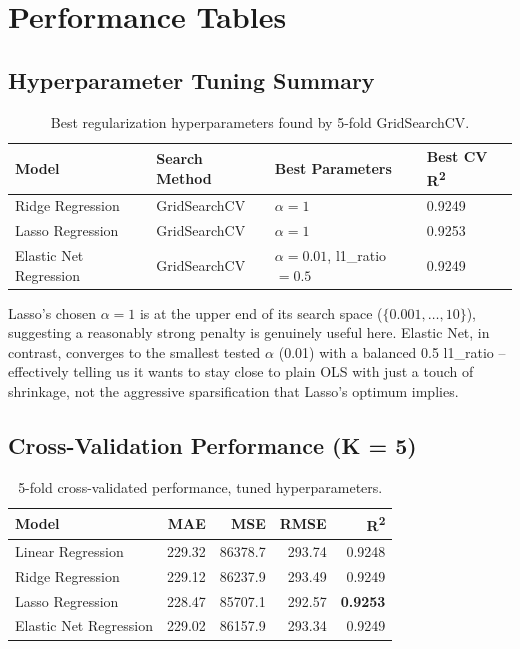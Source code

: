 \documentclass[11pt,a4paper]{article}
\begin{document}
\section{Performance Tables}

\subsection{Hyperparameter Tuning Summary}
\begin{table}[h]
\centering
\begin{tabular}{@{}llll@{}}
\toprule
Model & Search Method & Best Parameters & Best CV R\textsuperscript{2} \\
\midrule
Ridge Regression & GridSearchCV & $\alpha=1$ & 0.9249 \\
Lasso Regression & GridSearchCV & $\alpha=1$ & 0.9253 \\
Elastic Net Regression & GridSearchCV & $\alpha=0.01$, l1\_ratio$=0.5$ & 0.9249 \\
\bottomrule
\end{tabular}
\caption{Best regularization hyperparameters found by 5-fold GridSearchCV.}
\end{table}
Lasso's chosen $\alpha=1$ is at the upper end of its search space ($\{0.001, \ldots, 10\}$), suggesting a reasonably strong penalty is genuinely useful here. Elastic Net, in contrast, converges to the smallest tested $\alpha$ (0.01) with a balanced 0.5 l1\_ratio -- effectively telling us it wants to stay close to plain OLS with just a touch of shrinkage, not the aggressive sparsification that Lasso's optimum implies.

\subsection{Cross-Validation Performance (K = 5)}
\begin{table}[h]
\centering
\begin{tabular}{@{}lrrrr@{}}
\toprule
Model & MAE & MSE & RMSE & R\textsuperscript{2} \\
\midrule
Linear Regression & 229.32 & 86378.7 & 293.74 & 0.9248 \\
Ridge Regression & 229.12 & 86237.9 & 293.49 & 0.9249 \\
Lasso Regression & 228.47 & 85707.1 & 292.57 & \textbf{0.9253} \\
Elastic Net Regression & 229.02 & 86157.9 & 293.34 & 0.9249 \\
\bottomrule
\end{tabular}
\caption{5-fold cross-validated performance, tuned hyperparameters.}
\end{table}
\end{document}
